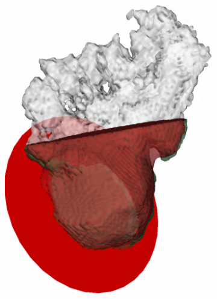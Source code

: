 \documentclass[review]{elsarticle}
\begin{document}
\begin{figure}[t]
\begin{subfigure}[b]{.16\linewidth}
    \includegraphics[width=\textwidth]{fig15_5.png}
    \caption{}\label{fig:siemens_b016}
  \end{subfigure}%
  \begin{subfigure}[b]{.16\linewidth}
    \centering

\end{subfigure}
\end{figure}
\end{document}
